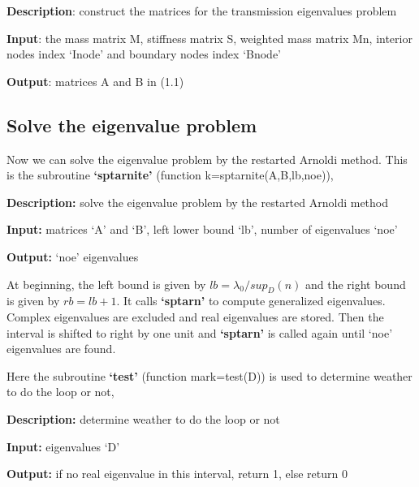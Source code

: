 \documentclass[12pt]{article}%
\numberwithin{equation}{section}
\numberwithin{remark}{section}
\numberwithin{example}{section}
\begin{document}
\textbf{Description}: construct the matrices for the transmission eigenvalues
problem

\textbf{Input}: the mass matrix M, stiffness matrix S, weighted mass matrix Mn,
interior nodes index `Inode' and boundary nodes index `Bnode'

\textbf{Output}: matrices A and B in (1.1)

\subsection{Solve the eigenvalue problem}
Now we can solve the eigenvalue problem by the restarted Arnoldi method.
This is the subroutine \textbf{`sptarnite'} (function k=sptarnite(A,B,lb,noe)),

\textbf{Description:} solve the eigenvalue problem by the restarted Arnoldi
method

\textbf{Input:} matrices `A' and `B', left lower bound `lb', number of eigenvalues
`noe'

\textbf{Output:} `noe' eigenvalues

At beginning, the left bound is given by $lb = \lambda_0/ sup_D(n)$ and the right
bound is given by $rb=lb+1$. It calls \textbf{`sptarn'} to compute generalized eigenvalues.
Complex eigenvalues are excluded and real eigenvalues are stored.
Then the interval is shifted to right by one unit and \textbf{`sptarn'} is called again
until `noe' eigenvalues are found.

Here the subroutine \textbf{`test'} (function mark=test(D)) is used to determine
weather to do the loop or not,

\textbf{Description:} determine weather to do the loop or not

\textbf{Input:} eigenvalues `D'

\textbf{Output:} if no real eigenvalue in this interval, return 1, else return 0
\end{document}
